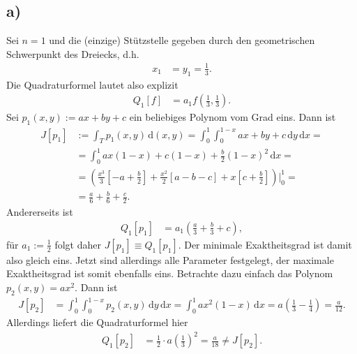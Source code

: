 \documentclass[english, parskip=full]{scrartcl}
\newcommand{\intx}{}
\newcommand{\kla}{}
\newcommand{\klam}{}
\begin{document}
\subsection*{a)}
Sei $n=1$ und die (einzige) Stützstelle gegeben durch den geometrischen Schwerpunkt des Dreiecks, d.h.
\begin{align}
x_1&=y_1 = \frac{1}{3}.
\end{align}
Die Quadraturformel lautet also explizit
\begin{align}
Q_1[f]&=a_1f\kla\left( \frac{1}{3},\frac{1}{3} \right).
\end{align}
Sei $p_1(x,y):=ax+by+c$ ein beliebiges Polynom vom Grad eins.
Dann ist
\begin{align}
J[p_1]&:=\intx\int_{T}^{}p_1(x,y)\, \mathrm{d}(x,y)=\intx\int_{0}^{1}\intx\int_{0}^{1-x}ax+by+c\, \mathrm{d}y\, \mathrm{d}x=\\
&= \intx\int_{0}^{1}ax(1-x)+c(1-x) + \frac{b}{2}(1-x)^2\, \mathrm{d}x =\\
&= \kla\left( \frac{x^3}{3}\klam\left[ -a+\frac{b}{2} \right]+\frac{x^2}{2}\klam\left[ a-b-c \right]+x\klam\left[ c + \frac{b}{2} \right] \right)\bigg\vert_0^1 =\\
&=\frac{a}{6}+\frac{b}{6}+\frac{c}{2}.
\end{align}
Andererseits ist
\begin{align}
Q_1[p_1] &= a_1\kla\left( \frac{a}{3} + \frac{b}{3} + c \right),
\end{align}
für $a_1:=\frac{1}{2}$ folgt daher $J[p_1]\equiv Q_1[p_1]$.
Der minimale Exaktheitsgrad ist damit also gleich eins.
Jetzt sind allerdings alle Parameter festgelegt, der maximale Exaktheitsgrad ist somit ebenfalls eins.
Betrachte dazu einfach das Polynom $p_2(x,y)=ax^2$.
Dann ist
\begin{align}
J[p_2] &= \intx\int_{0}^{1}\intx\int_{0}^{1-x}p_2(x,y)\, \mathrm{d}y\, \mathrm{d}x = \intx\int_{0}^{1}ax^2(1-x)\, \mathrm{d}x = a\kla\left( \frac{1}{3}-\frac{1}{4} \right)=\frac{a}{12}.
\end{align}
Allerdings liefert die Quadraturformel hier
\begin{align}
Q_1[p_2] &= \frac{1}{2}\cdot a\kla\left( \frac{1}{3} \right)^2 = \frac{a}{18}\neq J[p_2].
\end{align}
\end{document}
